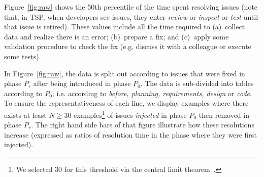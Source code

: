 \documentclass[smallcondensed]{svjour3}
\newcommand{\fig}[1]{Figure~\ref{fig:#1}}
\begin{document}
\fig{raw} shows the  50th  percentile
of the time spent resolving issues
(note that, in TSP, when developers see issues, they enter {\em review} or 
{\em inspect} or {\em test}
until that issue is retired).
These values include all the time required  to (a)~collect data and realize there is an error;
(b)~prepare a fix;  and (c)~apply some validation
procedure to check the fix (e.g. discuss it with a colleague or execute some tests).


In \fig{raw}, the data is split out according to issues that were fixed in phase $P_r$ after
being introduced in phase $P_0$. The data is sub-divided into tables according to $P_0$;
i.e. according to {\em before, planning, requirements, design} or {\em  code}. 
To ensure the representativeness of each line, we display examples
where there exists at least $N\ge 30$ examples\footnote{We selected 30
for this threshold via the central limit theorem~\cite{maxwelldata}.} of issues {\em injected} in phase $P_0$ then
removed in phase $P_r$.
The right hand side bars of that figure
illustrate how these resolutions increase (expressed as ratios of resolution time in the phase where they were first injected).
\end{document}
